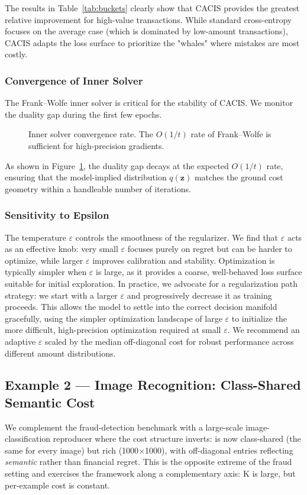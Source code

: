\documentclass[sigconf,anonymous]{acmart}
\newcommand{\CACIS}{\textsc{CACIS}}
\newcommand{\vz}{\mathbf{z}}
\newcommand{\mC}{\mathbf{C}}
\begin{document}
The results in Table~\ref{tab:buckets} clearly show that \CACIS{} provides the greatest relative improvement for high-value transactions. While standard cross-entropy focuses on the average case (which is dominated by low-amount transactions), \CACIS{} adapts the loss surface to prioritize the "whales" where mistakes are most costly.

\subsubsection{Convergence of Inner Solver}
The Frank--Wolfe inner solver is critical for the stability of \CACIS{}. We monitor the duality gap during the first few epochs.
\begin{figure}[h]
\centering
\scalebox{0.60}{}
\caption{Inner solver convergence rate. The $O(1/t)$ rate of Frank--Wolfe is sufficient for high-precision gradients.}
\label{fig:convergence}
\end{figure}
As shown in Figure~\ref{fig:convergence}, the duality gap decays at the expected $O(1/t)$ rate, ensuring that the model-implied distribution $q(\vz)$ matches the ground cost geometry within a handleable number of iterations.

\subsubsection{Sensitivity to Epsilon}
The temperature $\varepsilon$ controls the smoothness of the regularizer. We find that $\varepsilon$ acts as an effective knob: very small $\varepsilon$ focuses purely on regret but can be harder to optimize, while larger $\varepsilon$ improves calibration and stability. Optimization is typically simpler when $\varepsilon$ is large, as it provides a coarse, well-behaved loss surface suitable for initial exploration. In practice, we advocate for a regularization path strategy: we start with a larger $\varepsilon$ and progressively decrease it as training proceeds. This allows the model to settle into the correct decision manifold gracefully, using the simpler optimization landscape of large $\varepsilon$ to initialize the more difficult, high-precision optimization required at small $\varepsilon$. We recommend an adaptive $\varepsilon$ scaled by the median off-diagonal cost for robust performance across different amount distributions.

\subsection*{Example 2 --- Image Recognition: Class-Shared Semantic Cost}
\label{sec:imagenet}
We complement the fraud-detection benchmark with a large-scale image-classification reproducer where the cost structure inverts: \mC{} is now class-shared (the same for every image) but rich (1000$\times$1000), with off-diagonal entries reflecting \emph{semantic} rather than financial regret. This is the opposite extreme of the fraud setting and exercises the framework along a complementary axis: K is large, but per-example cost is constant.
\end{document}

